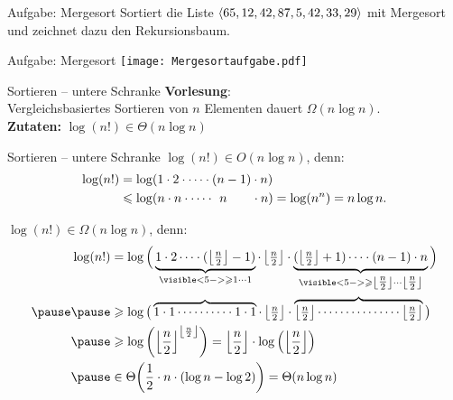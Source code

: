 \begin{frame}{Aufgabe: Mergesort}
	Sortiert die Liste $\langle 65,12,42,87,5,42,33,29 \rangle$ mit Mergesort und zeichnet dazu den Rekursionsbaum.
\end{frame}

\begin{frame}{Aufgabe: Mergesort}
	\solutionheading
	\medskip
	\texttt{[image: Mergesortaufgabe.pdf]}
\end{frame}

\begin{frame}[t]{Sortieren – untere Schranke}
	\textbf{Vorlesung}: \\
	\quad Vergleichsbasiertes Sortieren von $n$ Elementen dauert $\Omega(n \log n)$. \\
	\pause
	\bigskip
	\textbf{Zutaten:} \quad $\log(n!) \in \Theta(n\log n)$
	
\end{frame}

\begin{frame}{Sortieren – untere Schranke}
	$\log(n!) \in O(n\log n)$, denn: 
	\pause
	\begin{align*}
		\log(n!) &= \log(1 \cdot 2 \cdot \cdots \cdot (n-1) \cdot n) \\
				 &\leq \log(n \cdot n \cdot \cdots \cdot \hphantom{(} n \hphantom{{\!}-1)} \cdot n) = \log(n^n) = n\log n.
	\end{align*}
	\pause
	
	$\log(n!) \in \Omega(n\log n)$, denn:
	\pause
	\begin{align*}
		\log(n!) 
		&= \log \Big( 
		\underbrace{1 \cdot 2 \cdots \cdot ( 
			\floor{\tfrac{n}{2}} - 1
			)}_{\visible<5->{\geq 1 \cdots 1}}     \cdot \floor{\tfrac{n}{2}} \cdot     \underbrace{( 
			\floor{\tfrac{n}{2}} + 1
			)  \cdots \cdot (n-1 ) \cdot n }_{\visible<5->{\geq \floor{\tfrac{n}{2}} \cdots \floor{\tfrac{n}{2}}}}
		\Big) \\
		\pause\pause
		&\geq \log \big( \overbrace{1 \cdot 1 \cdots\cdots\cdots\cdot 1 \cdot 1}      \cdot \floor{\tfrac{n}{2}} \cdot     \overbrace{\floor{\tfrac{n}{2}}  \cdots \cdots \cdots\cdots\cdots \floor{\tfrac{n}{2}} } \big) \\
		\pause
		& \geq \log\left(\floor{\frac{n}{2}}^{\floor{\frac{n}{2}}}\right) = \floor{\frac{n}{2}} \cdot \log\left(\floor{\frac{n}{2}}\right) \\ 
		\pause
		& \in \Th{\frac{1}{2} \cdot n \cdot (\log n - \log 2 )} = \Theta(n \log n)
	\end{align*}
\end{frame}

